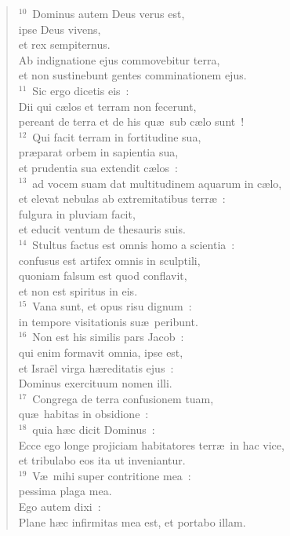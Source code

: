 \begin{flushleft}
\begin{verse}
${}^{10}$~Dominus autem Deus verus est,\\ ipse Deus vivens,\\ et rex sempiternus.\\ Ab indignatione ejus commovebitur terra,\\ et non sustinebunt gentes comminationem ejus.\\
${}^{11}$~Sic ergo dicetis eis~:\\ Dii qui c\ae los et terram non fecerunt,\\ pereant de terra et de his qu\ae\ sub c\ae lo sunt~!\\
${}^{12}$~Qui facit terram in fortitudine sua,\\ pr\ae parat orbem in sapientia sua,\\ et prudentia sua extendit c\ae los~:\\
${}^{13}$~ad vocem suam dat multitudinem aquarum in c\ae lo,\\ et elevat nebulas ab extremitatibus terr\ae~:\\ fulgura in pluviam facit,\\ et educit ventum de thesauris suis.\\
${}^{14}$~Stultus factus est omnis homo a scientia~:\\ confusus est artifex omnis in sculptili,\\ quoniam falsum est quod conflavit,\\ et non est spiritus in eis.\\
${}^{15}$~Vana sunt, et opus risu dignum~:\\ in tempore visitationis su\ae\ peribunt.\\
${}^{16}$~Non est his similis pars Jacob~:\\ qui enim formavit omnia, ipse est,\\ et Isra\"el virga h\ae reditatis ejus~:\\ Dominus exercituum nomen illi.\\
${}^{17}$~Congrega de terra confusionem tuam,\\ qu\ae\ habitas in obsidione~:\\
${}^{18}$~quia h\ae c dicit Dominus~:\\ Ecce ego longe projiciam habitatores terr\ae\ in hac vice,\\ et tribulabo eos ita ut inveniantur.\\
${}^{19}$~V\ae\ mihi super contritione mea~:\\ pessima plaga mea.\\ Ego autem dixi~:\\ Plane h\ae c infirmitas mea est, et portabo illam.\\

\end{verse}
\end{flushleft}

